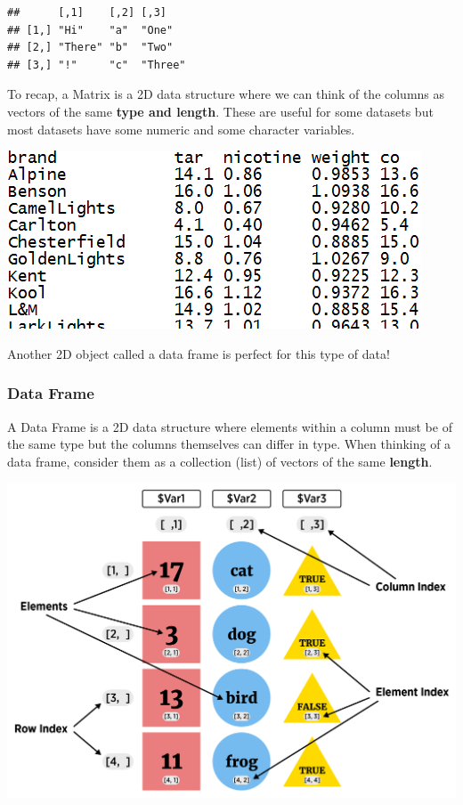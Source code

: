 \documentclass[
]{book}
\theoremstyle{definition}
\theoremstyle{definition}
\theoremstyle{definition}
\theoremstyle{remark}
\begin{document}
\begin{verbatim}
##      [,1]    [,2] [,3]   
## [1,] "Hi"    "a"  "One"  
## [2,] "There" "b"  "Two"  
## [3,] "!"     "c"  "Three"
\end{verbatim}

To recap, a Matrix is a 2D data structure where we can think of the columns as vectors of the same \textbf{type and length}. These are useful for some datasets but most datasets have some numeric and some character variables.

\begin{center}\includegraphics[width=0.8\linewidth]{img/dataset} \end{center}

Another 2D object called a data frame is perfect for this type of data!

\hypertarget{data-frame}{%
\subsubsection{Data Frame}\label{data-frame}}

A Data Frame is a 2D data structure where elements within a column must be of the same type but the columns themselves can differ in type. When thinking of a data frame, consider them as a collection (list) of vectors of the same \textbf{length}.

\begin{center}\includegraphics[width=0.8\linewidth]{img/dfVisualF} \end{center}
\end{document}
